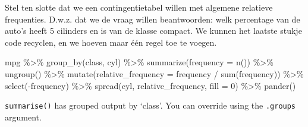 \documentclass[]{tufte-book}
\newenvironment{Shaded}{}{}
\newcommand{\AttributeTok}[1]{\textcolor[rgb]{0.49,0.56,0.16}{#1}}
\newcommand{\DecValTok}[1]{\textcolor[rgb]{0.25,0.63,0.44}{#1}}
\newcommand{\FunctionTok}[1]{\textcolor[rgb]{0.02,0.16,0.49}{#1}}
\newcommand{\NormalTok}[1]{#1}
\newcommand{\SpecialCharTok}[1]{\textcolor[rgb]{0.25,0.44,0.63}{#1}}
\begin{document}
Stel ten slotte dat we een contingentietabel willen met algemene relatieve frequenties. D.w.z. dat we de vraag willen beantwoorden: welk percentage van de auto's heeft 5 cilinders en is van de klasse compact. We kunnen het laatste stukje code recyclen, en we hoeven maar één regel toe te voegen.

\begin{Shaded}
\begin{Highlighting}[]
\NormalTok{mpg }\SpecialCharTok{\%\textgreater{}\%}
  \FunctionTok{group\_by}\NormalTok{(class, cyl) }\SpecialCharTok{\%\textgreater{}\%}
  \FunctionTok{summarize}\NormalTok{(}\AttributeTok{frequency =} \FunctionTok{n}\NormalTok{()) }\SpecialCharTok{\%\textgreater{}\%}
  \FunctionTok{ungroup}\NormalTok{() }\SpecialCharTok{\%\textgreater{}\%}
  \FunctionTok{mutate}\NormalTok{(}\AttributeTok{relative\_frequency =}\NormalTok{ frequency }\SpecialCharTok{/} \FunctionTok{sum}\NormalTok{(frequency)) }\SpecialCharTok{\%\textgreater{}\%}
  \FunctionTok{select}\NormalTok{(}\SpecialCharTok{{-}}\NormalTok{frequency) }\SpecialCharTok{\%\textgreater{}\%}
  \FunctionTok{spread}\NormalTok{(cyl, relative\_frequency, }\AttributeTok{fill =} \DecValTok{0}\NormalTok{) }\SpecialCharTok{\%\textgreater{}\%}
  \FunctionTok{pander}\NormalTok{()}
\end{Highlighting}
\end{Shaded}

\texttt{summarise()} has grouped output by `class'. You can override using the \texttt{.groups} argument.
\end{document}
